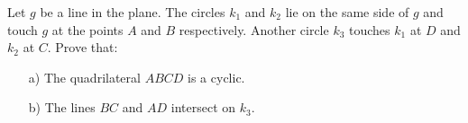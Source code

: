 Let $g$ be a line in the plane. The circles $k_1$ and $k_2$ lie on the same side of $g$ and
touch $g$ at the points $A$ and $B$ respectively.
Another circle $k_3$ touches $k_1$ at $D$ and $k_2$ at $C$. Prove that:
\begin{enumerate}
    \item[a)] The quadrilateral $ABCD$ is a cyclic.
    \item[b)] The lines $BC$ and $AD$ intersect on $k_3$.
\end{enumerate}
